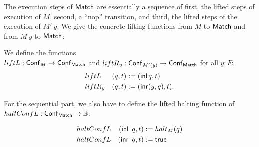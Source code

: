 The execution steps of $\mathsf{Match}$ are essentially a sequence of first, the lifted steps of execution of $M$, second, a ``nop'' transition, and third,
the lifted steps of the execution of $M'~y$.  We give the concrete lifting functions from $M$ to $\mathsf{Match}$ and from $M~y$ to $\mathsf{Match}$:
\begin{definition}
  We define the functions \\$liftL : \mathsf{Conf}_M \rightarrow \mathsf{Conf}_{\mathsf{Match}}$ and $liftR_y : \mathsf{Conf}_{M'(y)} \rightarrow \mathsf{Conf}_{\mathsf{Match}}$ for all $y:F$:
  \begin{alignat*}{2}
    & liftL   & (q, t) &:= (\operatorname{\mathsf{inl}} q,      t) \\
    & liftR_y & (q, t) &:= (\operatorname{\mathsf{inr}} (y, q), t).
  \end{alignat*}
\end{definition}

For the sequential part, we also have to define the lifted halting function of \\$haltConfL : \mathsf{Conf}_{\mathsf{Match}} \rightarrow \mathbb{B}$:
\begin{definition}
  \begin{alignat*}{2}
    & haltConfL & (\operatorname{\mathsf{inl}}~q, t) &:= halt_M(q) \\
    & haltConfL & (\operatorname{\mathsf{inr}}~q, t) &:= \mathsf{true}
  \end{alignat*}
\end{definition}

